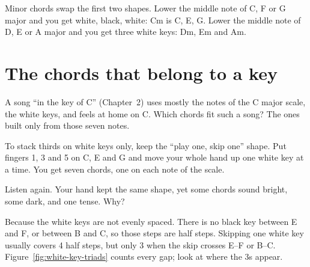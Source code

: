 \begin{intuitionbox}
Minor chords swap the first two shapes. Lower the middle note of C, F or G major and you get white, black, white: Cm is C, E\fl, G. Lower the middle note of D, E or A major and you get three white keys: Dm, Em and Am.
\end{intuitionbox}

\section{The chords that belong to a key}

A song ``in the key of C'' (Chapter~2) uses mostly the notes of the C major scale, the white keys, and feels at home on C. Which chords fit such a song? The ones built only from those seven notes.

To stack thirds on white keys only, keep the ``play one, skip one'' shape. Put fingers 1, 3 and 5 on C, E and G and move your whole hand up one white key at a time. You get seven chords, one on each note of the scale. 

Listen again. Your hand kept the same shape, yet some chords sound bright, some dark, and one tense. Why?

Because the white keys are not evenly spaced. There is no black key between E and F, or between B and C, so those steps are half steps. Skipping one white key usually covers 4 half steps, but only 3 when the skip crosses E--F or B--C. Figure~\ref{fig:white-key-triads} counts every gap; look at where the 3s appear.

